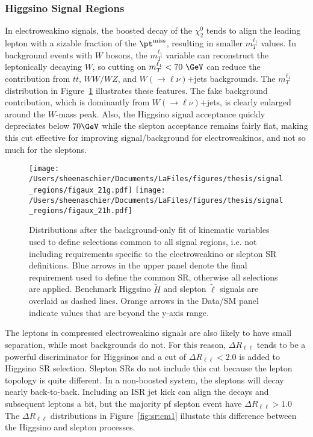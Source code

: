  \subsubsection{Higgsino Signal Regions}
\label{sec:sr:mll}
In electroweakino signals, the boosted decay of the $\chi_2^0$ tends to align the leading lepton with a sizable fraction of the $\pt^{\mathrm{miss}}$, resulting in smaller $m_T^{\ell_1}$ values.  In background events with $W$ bosons, the $m_T^{\ell_1}$ variable can reconstruct the leptonically decaying $W$, so cutting on $m_T^{\ell_1} < 70~\GeV$ can reduce the contribution from $t\bar{t}$, $WW/WZ$, and $W(\rightarrow\ell\nu)$+jets backgrounds.  The $m_T^{\ell_1}$ distribution in Figure~\ref{fig:sr:cm4} illustrates these features.  The fake background contribution, which is dominantly from $W(\rightarrow\ell\nu)$+jets, is clearly enlarged around the $W$-mass peak.  Also, the Higgsino signal acceptance quickly depreciates below $70\GeV$ while the slepton acceptance remains fairly flat, making this cut effective for improving signal/background for electroweakinos, and not so much for the sleptons.
   \begin{figure}%
  \begin{center}
      \texttt{[image: /Users/sheenaschier/Documents/LaFiles/figures/thesis/signal\_regions/figaux\_21g.pdf]}
         \texttt{[image: /Users/sheenaschier/Documents/LaFiles/figures/thesis/signal\_regions/figaux\_21h.pdf]}
   \end{center}
 \caption{Distributions after the background-only fit of kinematic variables used to define selections common to all signal regions, i.e. not including requirements specific to the electroweakino or slepton SR definitions. Blue arrows in the upper panel denote the final requirement used to define the common SR, otherwise all selections are applied. %
Benchmark Higgsino $\tilde H$ and slepton $\tilde\ell$ signals are overlaid as dashed lines. Orange arrows in the Data/SM panel indicate values that are beyond the y-axis range.}
 \label{fig:sr:cm4}
 \end{figure}

The leptons in compressed electroweakino signals are also likely to have small separation, while most backgrounds do not.  For this reason, $\Delta R_{\ell\ell}$ tends to be a powerful discriminator for Higgsinos and a cut of $\Delta R_{\ell\ell} < 2.0$ is added to Higgsino SR selection.  Slepton SRs do not include this cut because the lepton topology is quite different.  In a non-boosted system, the sleptons will decay nearly back-to-back.  Including an ISR jet kick can align the decays and subsequent leptons a bit, but the majority pf slepton event have $\Delta R_{\ell\ell} >1.0$   The $\Delta R_{\ell\ell}$ distributions in Figure~\ref{fig:sr:cm1} illustate this difference between the Higgsino and slepton processes. 

